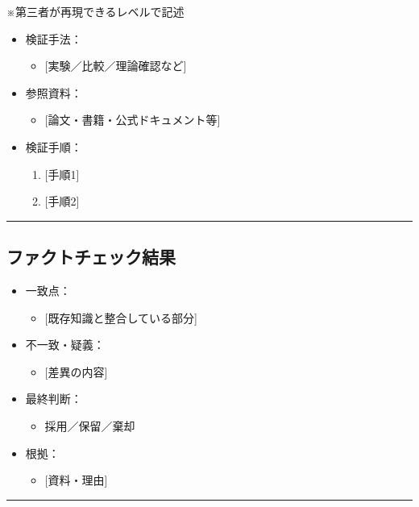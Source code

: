 \documentclass[uplatex,dvipdfmx,a4paper,11pt]{jsarticle}
\newcommand{\sectionrule}{\par\medskip\noindent\rule{\linewidth}{0.6pt}\par\medskip}
\begin{document}
※第三者が再現できるレベルで記述

\begin{itemize}
  \item 検証手法：
    \begin{itemize}
      \item {}[実験／比較／理論確認など]
    \end{itemize}
  \item 参照資料：
    \begin{itemize}
      \item {}[論文・書籍・公式ドキュメント等]
    \end{itemize}
  \item 検証手順：
    \begin{enumerate}
      \item {}[手順1]
      \item {}[手順2]
    \end{enumerate}
\end{itemize}

\sectionrule

\subsection{ファクトチェック結果}

\begin{itemize}
  \item 一致点：
    \begin{itemize}
      \item {}[既存知識と整合している部分]
    \end{itemize}
  \item 不一致・疑義：
    \begin{itemize}
      \item {}[差異の内容]
    \end{itemize}
  \item 最終判断：
    \begin{itemize}
      \item 採用／保留／棄却
    \end{itemize}
  \item 根拠：
    \begin{itemize}
      \item {}[資料・理由]
    \end{itemize}
\end{itemize}

\sectionrule

\end{document}
